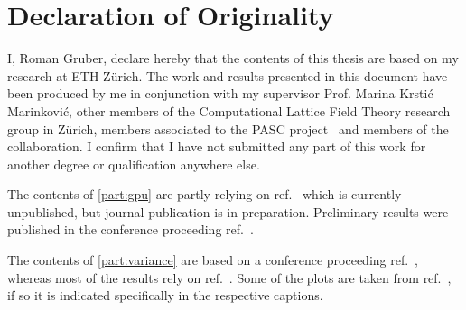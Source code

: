 \begingroup
\let\clearpage\relax
\let\cleardoublepage\relax
\let\cleardoublepage\relax

\chapter*{Declaration of Originality}

I, Roman Gruber, declare hereby that the contents of this thesis are based on my research at ETH Zürich.
The work and results presented in this document have been produced by me in conjunction with my supervisor Prof. Marina Krstić Marinković, other members of the Computational Lattice Field Theory research group in Zürich, members associated to the PASC project~\cite{online:pasc2021} and members of the \RCstar collaboration.
I confirm that I have not submitted any part of this work for another degree or qualification anywhere else.

The contents of \cref{part:gpu} are partly relying on ref.~ which is currently unpublished, but journal publication is in preparation.
Preliminary results were published in the conference proceeding ref.~.

The contents of \cref{part:variance} are based on a conference proceeding ref.~, whereas most of the results rely on ref.~.
Some of the plots are taken from ref.~, if so it is indicated specifically in the respective captions.

\endgroup
